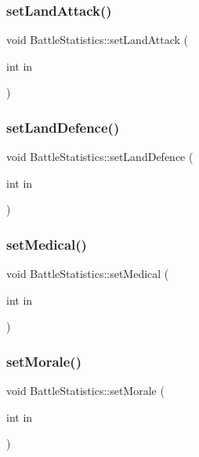\subsubsection{\texorpdfstring{setLandAttack()}{setLandAttack()}}
{\footnotesize\ttfamily void Battle\+Statistics\+::set\+Land\+Attack (\begin{DoxyParamCaption}\item[{int}]{in }\end{DoxyParamCaption})}

\mbox{\label{class_battle_statistics_ab0f56ad463807fad79d1bedd82a790a6}} 
\subsubsection{\texorpdfstring{setLandDefence()}{setLandDefence()}}
{\footnotesize\ttfamily void Battle\+Statistics\+::set\+Land\+Defence (\begin{DoxyParamCaption}\item[{int}]{in }\end{DoxyParamCaption})}

\mbox{\label{class_battle_statistics_a7c8b9a07dd588e8a0b74424b9041763f}} 
\subsubsection{\texorpdfstring{setMedical()}{setMedical()}}
{\footnotesize\ttfamily void Battle\+Statistics\+::set\+Medical (\begin{DoxyParamCaption}\item[{int}]{in }\end{DoxyParamCaption})}

\mbox{\label{class_battle_statistics_aa23a73724ddc3727dc1147f06cbd5d69}} 
\subsubsection{\texorpdfstring{setMorale()}{setMorale()}}
{\footnotesize\ttfamily void Battle\+Statistics\+::set\+Morale (\begin{DoxyParamCaption}\item[{int}]{in }\end{DoxyParamCaption})}


